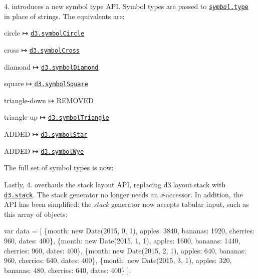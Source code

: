 4. introduces a new symbol type A\+PI. Symbol types are passed to \href{https://github.com/d3/d3-shape/blob/master/README.md#symbol_type}{\tt {\itshape symbol}.type} in place of strings. The equivalents are\+:


\begin{DoxyItemize}
\item circle ↦ \href{https://github.com/d3/d3-shape/blob/master/README.md#symbolCircle}{\tt d3.\+symbol\+Circle}
\item cross ↦ \href{https://github.com/d3/d3-shape/blob/master/README.md#symbolCross}{\tt d3.\+symbol\+Cross}
\item diamond ↦ \href{https://github.com/d3/d3-shape/blob/master/README.md#symbolDiamond}{\tt d3.\+symbol\+Diamond}
\item square ↦ \href{https://github.com/d3/d3-shape/blob/master/README.md#symbolSquare}{\tt d3.\+symbol\+Square}
\item triangle-\/down ↦ R\+E\+M\+O\+V\+ED
\item triangle-\/up ↦ \href{https://github.com/d3/d3-shape/blob/master/README.md#symbolTriangle}{\tt d3.\+symbol\+Triangle}
\item A\+D\+D\+ED ↦ \href{https://github.com/d3/d3-shape/blob/master/README.md#symbolStar}{\tt d3.\+symbol\+Star}
\item A\+D\+D\+ED ↦ \href{https://github.com/d3/d3-shape/blob/master/README.md#symbolWye}{\tt d3.\+symbol\+Wye}
\end{DoxyItemize}

The full set of symbol types is now\+:

\href{#symbolCircle}{\tt }\href{#symbolCross}{\tt }\href{#symbolDiamond}{\tt }\href{#symbolSquare}{\tt }\href{#symbolStar}{\tt }\href{#symbolTriangle}{\tt }

Lastly, 4. overhauls the stack layout A\+PI, replacing d3.\+layout.\+stack with \href{https://github.com/d3/d3-shape/blob/master/README.md#stacks}{\tt d3.\+stack}. The stack generator no longer needs an {\itshape x}-\/accessor. In addition, the A\+PI has been simplified\+: the {\itshape stack} generator now accepts tabular input, such as this array of objects\+:


\begin{DoxyCode}
var data = [
  \{month: new Date(2015, 0, 1), apples: 3840, bananas: 1920, cherries: 960, dates: 400\},
  \{month: new Date(2015, 1, 1), apples: 1600, bananas: 1440, cherries: 960, dates: 400\},
  \{month: new Date(2015, 2, 1), apples:  640, bananas:  960, cherries: 640, dates: 400\},
  \{month: new Date(2015, 3, 1), apples:  320, bananas:  480, cherries: 640, dates: 400\}
];
\end{DoxyCode}


